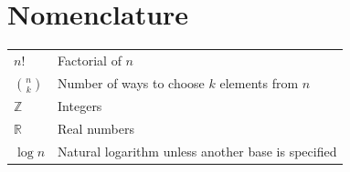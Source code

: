 \section{Nomenclature}

\begin{tabularx}{\linewidth}{@{}lX@{}}
$n!$ & Factorial of $n$ \\
$\binom{n}{k}$ & Number of ways to choose $k$ elements from $n$ \\
$\mathbb{Z}$ & Integers \\
$\mathbb{R}$ & Real numbers \\
$\log n$ & Natural logarithm unless another base is specified \\
\end{tabularx}
